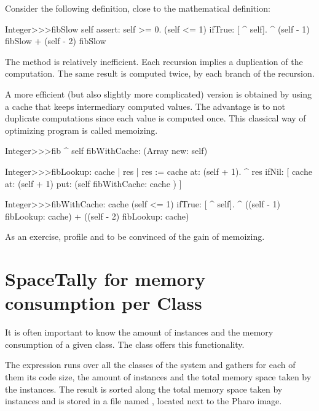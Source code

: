 \documentclass[a4paper,10pt,twoside]{book}
\begin{document}
Consider the following definition, close to the mathematical definition:
\begin{code}{}
Integer>>>fibSlow
	self assert: self >= 0.
	(self <= 1) ifTrue: [ ^ self].
	^ (self - 1) fibSlow + (self - 2) fibSlow
\end{code}

The method  is relatively inefficient. Each recursion implies a duplication of the computation. The same result is computed twice, by each branch of the recursion.

A more efficient (but also slightly more complicated) version is obtained by using a cache that keeps intermediary computed values. The advantage is to not duplicate computations since each value is computed once. This classical way of optimizing program is called memoizing. 
      
\begin{code}{}
Integer>>>fib
	^ self fibWithCache: (Array new: self)

Integer>>>fibLookup: cache
	| res |
	res := cache at: (self + 1).
	^ res ifNil: [ cache at: (self + 1) put:  (self fibWithCache: cache  ) ]

Integer>>>fibWithCache:  cache
	(self <= 1) ifTrue: [ ^ self].
	^ ((self - 1) fibLookup: cache) + ((self - 2) fibLookup: cache)  
\end{code}


As an exercise, profile  and  to be convinced of the gain of memoizing. 

\section{SpaceTally for memory consumption per Class}

It is often important to know the amount of instances and the memory consumption of a given class. The class  offers this functionality. 

The expression  runs over all the classes of the system and gathers for each of them its code size, the amount of instances and the total memory space taken by the instances. The result is sorted along the total memory space taken by instances and is stored in a file named , located next to the Pharo image.
\end{document}

